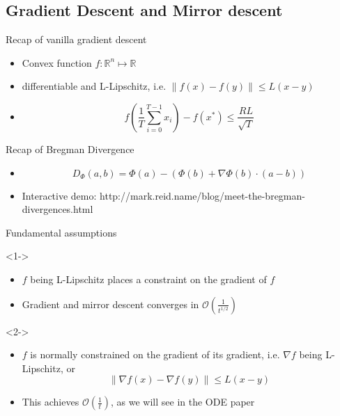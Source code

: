 \documentclass[english]{beamer}
\begin{document}
\subsection[Gradient Descent and Mirror descent]{Gradient Descent and Mirror descent}
\begin{frame}{Recap of vanilla gradient descent}

\begin{itemize}
\item<1-> Convex function $f:  \mathbb{R}^{n}\mapsto \mathbb{R}$

\item<2-> differentiable and L-Lipschitz, i.e. $\|f(x) - f(y)\| \leq L(x - y)$

\item<3-> \begin{equation*}
    f\left(\frac{1}{T} \sum_{i=0}^{T-1} x_{i}\right)-f\left(x^{*}\right) \leq \frac{R L}{\sqrt{T}}
\end{equation*}


\end{itemize}
\end{frame}
%
\begin{frame}{Recap of Bregman Divergence}
\begin{itemize}
\item \begin{equation*}
    D_{\Phi}(a, b)=\Phi(a)-(\Phi(b)+\nabla \Phi(b) \cdot(a-b))
\end{equation*}
\pause{}

\item Interactive demo: http://mark.reid.name/blog/meet-the-bregman-divergences.html

\end{itemize}
\end{frame}

\begin{frame}{Fundamental assumptions}
\begin{block}<1->{}
\begin{itemize}
\item $f$ being L-Lipschitz places a constraint on the gradient of $f$
\item Gradient and mirror descent converges in $\mathcal{O}(\frac{1}{t^{1/2}})$
\end{itemize}
\end{block}

\begin{block}<2->{}
\begin{itemize}
\item $f$ is normally constrained on the gradient of its gradient, i.e. $\nabla f$ being L-Lipschitz, or $$\|\nabla f(x) - \nabla f(y)\| \leq L(x - y)$$
\item This achieves $\mathcal{O}(\frac{1}{t})$, as we will see in the ODE paper
\end{itemize}
\end{block}
\end{frame}
\end{document}
